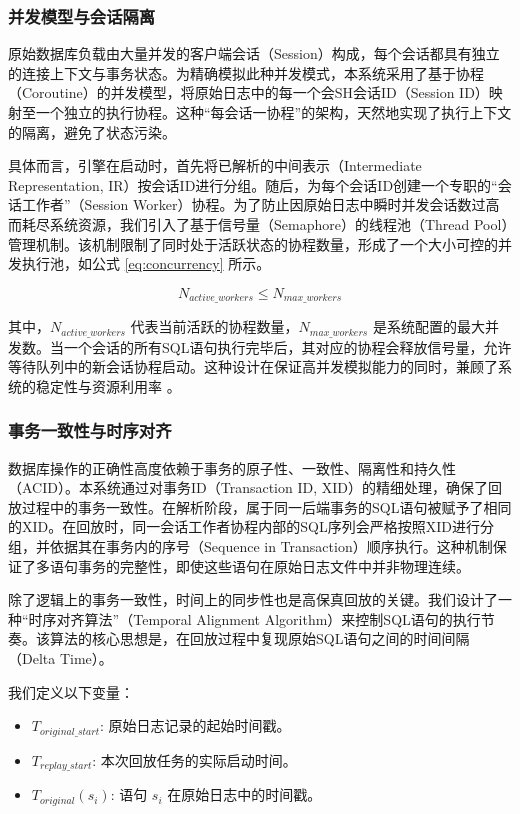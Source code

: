 \subsubsection{并发模型与会话隔离}
原始数据库负载由大量并发的客户端会话（Session）构成，每个会话都具有独立的连接上下文与事务状态。为精确模拟此种并发模式，本系统采用了基于协程（Coroutine）的并发模型，将原始日志中的每一个会SH会话ID（Session ID）映射至一个独立的执行协程。这种“每会话一协程”的架构，天然地实现了执行上下文的隔离，避免了状态污染。

具体而言，引擎在启动时，首先将已解析的中间表示（Intermediate Representation, IR）按会话ID进行分组。随后，为每个会话ID创建一个专职的“会话工作者”（Session Worker）协程。为了防止因原始日志中瞬时并发会话数过高而耗尽系统资源，我们引入了基于信号量（Semaphore）的线程池（Thread Pool）管理机制。该机制限制了同时处于活跃状态的协程数量，形成了一个大小可控的并发执行池，如公式 \ref{eq:concurrency} 所示。

\begin{equation}
\label{eq:concurrency}
N_{active\_workers} \le N_{max\_workers}
\end{equation}

其中，$N_{active\_workers}$ 代表当前活跃的协程数量，$N_{max\_workers}$ 是系统配置的最大并发数。当一个会话的所有SQL语句执行完毕后，其对应的协程会释放信号量，允许等待队列中的新会话协程启动。这种设计在保证高并发模拟能力的同时，兼顾了系统的稳定性与资源利用率 \cite{GoConcurrencyPatterns}。

\subsubsection{事务一致性与时序对齐}
数据库操作的正确性高度依赖于事务的原子性、一致性、隔离性和持久性（ACID）\cite{ACIDProperties}。本系统通过对事务ID（Transaction ID, XID）的精细处理，确保了回放过程中的事务一致性。在解析阶段，属于同一后端事务的SQL语句被赋予了相同的XID。在回放时，同一会话工作者协程内部的SQL序列会严格按照XID进行分组，并依据其在事务内的序号（Sequence in Transaction）顺序执行。这种机制保证了多语句事务的完整性，即使这些语句在原始日志文件中并非物理连续。

除了逻辑上的事务一致性，时间上的同步性也是高保真回放的关键。我们设计了一种“时序对齐算法”（Temporal Alignment Algorithm）来控制SQL语句的执行节奏。该算法的核心思想是，在回放过程中复现原始SQL语句之间的时间间隔（Delta Time）。

我们定义以下变量：
\begin{itemize}
    \item $T_{original\_start}$: 原始日志记录的起始时间戳。
    \item $T_{replay\_start}$: 本次回放任务的实际启动时间。
    \item $T_{original}(s_i)$: 语句 $s_i$ 在原始日志中的时间戳。
\end{itemize}

